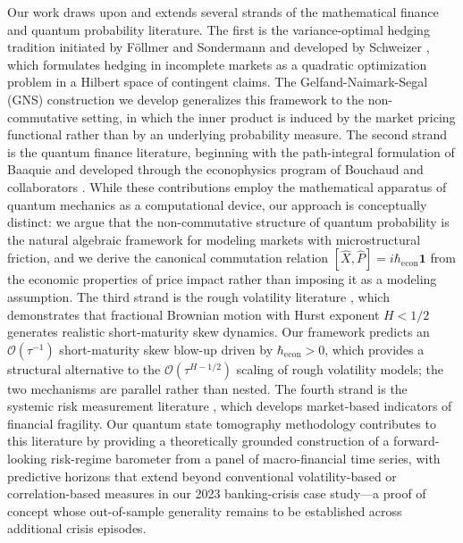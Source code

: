 Our work draws upon and extends several strands of the mathematical finance and
quantum probability literature. The first is the variance-optimal hedging tradition
initiated by F\"ollmer and Sondermann \citep{follmer1986hedging} and developed by
Schweizer \citep{schweizer1995variance,schweizer2001guided}, which formulates hedging
in incomplete markets as a quadratic optimization problem in a Hilbert space of
contingent claims. The Gelfand-Naimark-Segal (GNS) construction we develop generalizes
this framework to the non-commutative setting, in which the inner product is induced
by the market pricing functional rather than by an underlying probability measure.
The second strand is the quantum finance literature, beginning with the path-integral
formulation of Baaquie \citep{baaquie1997path,baaquie2004quantum} and developed
through the econophysics program of Bouchaud and collaborators
\citep{bouchaud2003theory}. While these contributions employ the mathematical
apparatus of quantum mechanics as a computational device, our approach is conceptually
distinct: we argue that the non-commutative structure of quantum probability is the
natural algebraic framework for modeling markets with microstructural friction, and
we derive the canonical commutation relation
$[\hat{X}, \hat{P}] = i\hbar_{\mathrm{econ}} \mathbf{1}$ from the economic properties
of price impact rather than imposing it as a modeling assumption. The third strand is
the rough volatility literature
\citep{comte1998long,bayer2015pricing,gatheral2018volatility,eleuch2018microstructural},
which demonstrates that fractional Brownian motion with Hurst exponent $H < 1/2$
generates realistic short-maturity skew dynamics. Our framework predicts an
$\mathcal{O}(\tau^{-1})$ short-maturity skew blow-up driven by
$\hbar_{\mathrm{econ}} > 0$, which provides a structural alternative to the
$\mathcal{O}(\tau^{H-1/2})$ scaling of rough volatility models; the two mechanisms
are parallel rather than nested. The fourth strand is the systemic risk measurement
literature \citep{adrian2016covar,brownlees2016srisk,acharya2017measuring}, which
develops market-based indicators of financial fragility. Our quantum state tomography
methodology contributes to this literature by providing a theoretically grounded
construction of a forward-looking risk-regime barometer from a panel of macro-financial
time series, with predictive horizons that extend beyond conventional
volatility-based or correlation-based measures in our 2023 banking-crisis
case study---a proof of concept whose out-of-sample generality remains to
be established across additional crisis episodes.

